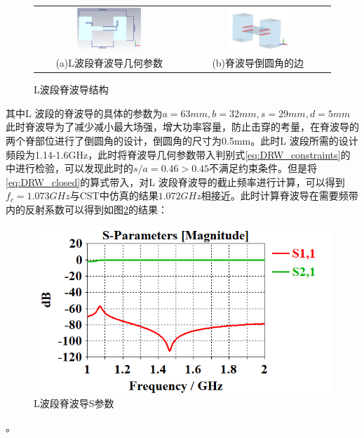 \documentclass[master]{thesis-uestc}
\begin{document}
\begin{figure}[!htb]
    \small
    \centering
    \begin{tabular}{@{\ }c@{\ }c}
        \includegraphics[width=0.45\textwidth]{pic/chapter4/L波段脊波导几何参数.png} & 
        \hspace{5pt}
        \includegraphics[width=0.45\textwidth]{pic/chapter4/脊波导倒圆角边.png}     \\
        \mbox{\small (a)L波段脊波导几何参数}                                                                               & 
        \mbox{\small (b)脊波导倒圆角的边}                                                                                  \\
    \end{tabular}
    \caption{L波段脊波导结构}
    \label{fig:L波段脊波导结构}
\end{figure}

其中L 波段的脊波导的具体的参数为$a=63mm, b=32mm, s=29mm, d=5mm$此时脊波导为了减少减小最大场强，增大功率容量，防止击穿的考量，在脊波导的两个脊部位进行了倒圆角的设计，倒圆角的尺寸为0.5mm。此时L 波段所需的设计频段为1.14-1.6GHz，此时将脊波导几何参数带入判别式\ref{eq:DRW_constraints}的中进行检验，可以发现此时的$s / a =0.46>0.45$不满足约束条件。但是将\ref{eq:DRW_closed}的算式带入，对L 波段脊波导的截止频率进行计算，可以得到$f_c=1.073GHz$与CST中仿真的结果$1.072GHz$相接近。此时计算脊波导在需要频带内的反射系数可以得到如图\ref{fig:L波段脊波导S参数}的结果：
\begin{figure}[!htb]
    \centering
    \includegraphics[width=0.5\linewidth]{pic/chapter4/L波段脊波导S参数.png}
    \caption{L波段脊波导S参数}
    \label{fig:L波段脊波导S参数}
\end{figure}。
\end{document}
